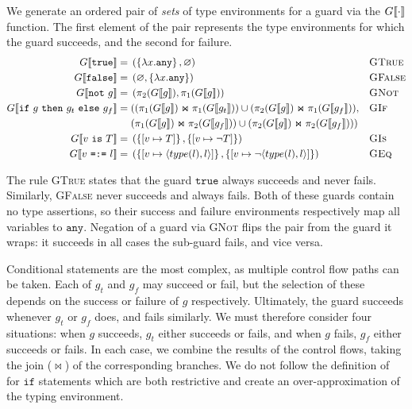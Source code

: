 \documentclass[nonacm,timestamp,manuscript]{acmart}
\newcommand{\atom}[1]{\texttt{#1}}
\newcommand{\singleton}[2]{\langle #1, #2 \rangle} %
\newcommand{\res}[1]{\texttt{#1}}
\begin{document}
\begin{definition}

  We generate an ordered pair of \textit{sets} of type environments for a guard
  via the ${G \llbracket{} \cdot \rrbracket{}}$ function. The first element of the pair represents the
  type environments for which the guard succeeds, and the second for failure.
  \begin{align*}
    \Gden{\res{true}
    } ={}&
           \left(
           \left\{ \lambda x . \atom{any} \right\}
           ,
           \varnothing
           \right)
    && \textsc{GTrue} \\
    \Gden{\res{false}
    } ={}&
           \left(
           \varnothing
           ,
           \left\{ \lambda x . \atom{any} \right\}
           \right)
    && \textsc{GFalse} \\
    \Gden{\res{not}\ g
    } ={}&
           \left(
           \ProjR{\Gden{g}}
           ,
           \ProjL{\Gden{g}}
           \right)
    && \textsc{GNot} \\
    \Gden{\res{if}\ g\ \res{then}\ g_t\ \res{else}\ g_f
    } ={}&
           ( (\JoinG{\ProjL{\Gden{g}}}{\ProjL{\Gden{g_t}}}) \cup (\JoinG{\ProjR{\Gden{g}}}{\ProjL{\Gden{g_f}}}),
    && \textsc{GIf} \\
         & (\JoinG{\ProjL{\Gden{g}}}{\ProjR{\Gden{g_f}}} ) \cup (\JoinG{\ProjR{\Gden{g}}}{\ProjR{\Gden{g_f}}} ) ) \\
    \Gden{v\ \res{is}\ T
    } ={}&
           \left(
           \left\{ \Map{v}{T} \right\}
           ,
           \left\{ \Map{v}{\neg T} \right\}
           \right)
    && \textsc{GIs} \\
    \Gden{v\ \res{=:=}\ l
    } ={}&
           \left(
           \left\{ \Map{v}{\singleton{type(l)}{l}} \right\}
           ,
           \left\{ \Map{v}{\neg \singleton{type(l)}{l}} \right\}
           \right)
    && \textsc{GEq}
  \end{align*}
\end{definition}

The rule \textsc{GTrue} states that the guard $\res{true}$ always succeeds and
never fails. Similarly, \textsc{GFalse} never succeeds and always fails. Both
of these guards contain no type assertions, so their success and failure
environments respectively map all variables to $\atom{any}$. Negation of a
guard via \textsc{GNot} flips the pair from the guard it wraps: it succeeds in
all cases the sub-guard fails, and vice versa.

Conditional statements are the most complex, as multiple control flow paths can
be taken. Each of $g_t$ and $g_f$ may succeed or fail, but the selection of
these depends on the success or failure of $g$ respectively. Ultimately, the
guard succeeds whenever $g_t$ or $g_f$ does, and fails similarly. We must
therefore consider four situations: when $g$ succeeds, $g_t$ either succeeds or
fails, and when $g$ fails, $g_f$ either succeeds or fails. In each case, we
combine the results of the control flows, taking the join ($\Join$) of the
corresponding branches. We do not follow the definition of~\cite{Pearce2013} for
$\res{if}$ statements which are both restrictive and create an
over-approximation of the typing environment.
\end{document}
